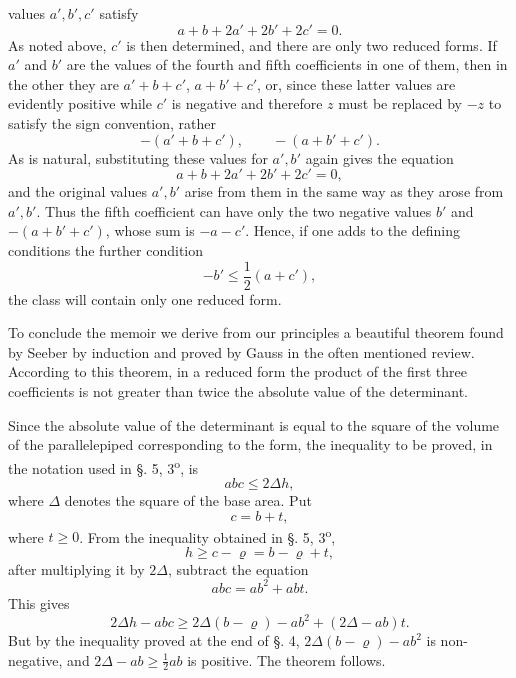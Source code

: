 \documentclass[11pt]{article}
\newcommand{\ordlabel}[1]{#1\textsuperscript{o}}
\begin{document}
values $a',b',c'$ satisfy
\[
 a+b+2a'+2b'+2c'=0.
\]
As noted above, $c'$ is then determined, and there are only two reduced forms. If $a'$ and $b'$ are the values of the fourth and fifth coefficients in one of them, then in the other they are $a'+b+c'$, $a+b'+c'$, or, since these latter values are evidently positive while $c'$ is negative and therefore $z$ must be replaced by $-z$ to satisfy the sign convention, rather
\[
 -(a'+b+c'),\qquad -(a+b'+c').
\]
As is natural, substituting these values for $a',b'$ again gives the equation
\[
 a+b+2a'+2b'+2c'=0,
\]
and the original values $a',b'$ arise from them in the same way as they arose from $a',b'$. Thus the fifth coefficient can have only the two negative values $b'$ and $-(a+b'+c')$, whose sum is $-a-c'$. Hence, if one adds to the defining conditions the further condition
\[
 -b'\le \frac12(a+c'),
\]
the class will contain only one reduced form.

To conclude the memoir we derive from our principles a beautiful theorem found by Seeber by induction and proved by Gauss in the often mentioned review. According to this theorem, in a reduced form the product of the first three coefficients is not greater than twice the absolute value of the determinant.

Since the absolute value of the determinant is equal to the square of the volume of the parallelepiped corresponding to the form, the inequality to be proved, in the notation used in §. 5, \ordlabel{3}, is
\[
 abc\le 2\Delta h,
\]
where $\Delta$ denotes the square of the base area. Put
\[
 c=b+t,
\]
where $t\ge0$. From the inequality obtained in §. 5, \ordlabel{3},
\[
 h\ge c-\varrho=b-\varrho+t,
\]
after multiplying it by $2\Delta$, subtract the equation
\[
 abc=ab^2+abt.
\]
This gives
\[
 2\Delta h-abc\ge 2\Delta(b-\varrho)-ab^2+(2\Delta-ab)t.
\]
But by the inequality proved at the end of §. 4, $2\Delta(b-\varrho)-ab^2$ is non-negative, and $2\Delta-ab\ge \frac12 ab$ is positive. The theorem follows.
\end{document}
